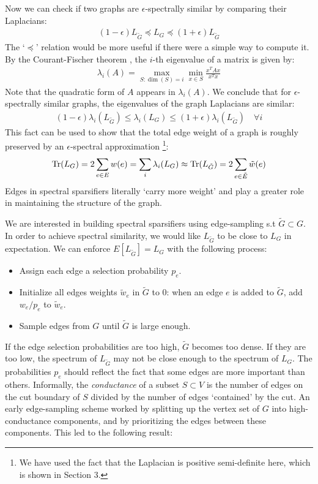 \documentclass{article}
\begin{document}
Now we can check if two graphs are $\epsilon$-spectrally similar by
comparing their Laplacians:
\begin{align*}
    (1 - \epsilon)L_{\tilde{G}} \preceq L_G \preceq (1 +
    \epsilon)L_{\tilde{G}}
\end{align*}
The `$\preceq$' relation would be more useful if there were a simple way to
compute it. By the Courant-Fischer theorem \cite{CourantFischer}, the $i$-th
eigenvalue of a matrix is given by:
\begin{align*}
    \lambda_i(A) = \max_{S: \dim(S) = i} \min_{x \in S} \frac{x^TAx}{x^Tx}
\end{align*}
Note that the quadratic form of $A$ appears in $\lambda_i(A)$. We conclude
that for $\epsilon$-spectrally similar graphs, the eigenvalues of the graph
Laplacians are similar:
\begin{align*}
    (1 - \epsilon)\lambda_i(L_{\tilde{G}}) \leq \lambda_i(L_G) \leq (1 +
    \epsilon)\lambda_i(L_{\tilde{G}}) \quad \forall{i}
\end{align*}
This fact can be used to show that the total edge weight of a graph is
roughly preserved by an $\epsilon$-spectral approximation \footnote{We have
used the fact that the Laplacian is positive semi-definite here, which is
shown in Section 3.}:
\begin{align*}
    \text{Tr}(L_G) = 2\sum_{e \in E} w(e) = \sum_i \lambda_i(L_G) \approx
    \text{Tr}(L_{\tilde{G}}) = 2\sum_{e \in \tilde{E}} \tilde{w}(e)
\end{align*}
Edges in spectral sparsifiers literally `carry more weight' and play a
greater role in maintaining the structure of the graph.

We are interested in building spectral sparsifiers using edge-sampling s.t
$\tilde{G} \subset G$. In order to achieve spectral similarity, we would
like $L_{\tilde{G}}$ to be close to $L_G$ in expectation. We can enforce
$E[L_{\tilde{G}}] = L_G$ with the following process:
\begin{itemize}
    \item Assign each edge a selection probability $p_e$.
    \item Initialize all edges weights $\tilde{w}_e$ in $\tilde{G}$ to 0:
        when an edge $e$ is added to $\tilde{G}$, add $w_e/p_e$ to
        $\tilde{w}_e$.
    \item Sample edges from $G$ until $\tilde{G}$ is large enough.
\end{itemize}

If the edge selection probabilities are too high, $\tilde{G}$ becomes too
dense. If they are too low, the spectrum of $L_{\tilde{G}}$ may not be close
enough to the spectrum of $L_G$. The probabilities $p_e$ should reflect the
fact that some edges are more important than others. Informally, the
\textit{conductance} of a subset $S \subset V$ is the number of edges on the
cut boundary of $S$ divided by the number of edges `contained' by the cut.
An early edge-sampling scheme worked by splitting up the vertex set of $G$
into high-conductance components, and by prioritizing the edges between
these components. This led to the following result: \\
\end{document}
